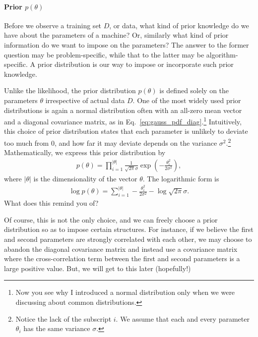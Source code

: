 \documentclass{report}
\begin{document}
\paragraph{Prior $p(\theta)$}

Before we observe a training set $D$, or data, what kind of prior knowledge do
we have about the parameters of a machine? Or, similarly what kind of prior
information do we want to impose on the parameters? The answer to the former
question may be problem-specific, while that to the latter may be
algorithm-specific. A prior distribution is our way to impose or incorporate
such prior knowledge. 

Unlike the likelihood, the prior distribution $p(\theta)$ is defined solely on
the parameters $\theta$ irrespective of actual data $D$. One of the most widely
used prior distributions is again a normal distribution often with an all-zero
mean vector and a diagonal covariance matrix, as in
Eq.~\eqref{eq:gauss_pdf_diag}.\footnote{
    Now you see why I introduced a normal distribution only when we were
    discussing about common distributions.
} Intuitively, this choice of prior distribution states that each parameter is
unlikely to deviate too much from $0$, and how far it may deviate depends on the
variance $\sigma^2$.\footnote{
    Notice the lack of the subscript $i$. We assume that each and every
    parameter $\theta_i$ has the same variance $\sigma$.
}
Mathematically, we express this prior distribution by
\begin{align*}
    p(\theta) = \prod_{i=1}^{|\theta|} \frac{1}{\sqrt{2\pi} \sigma} \exp \left(
    -\frac{\theta_i^2}{2 \sigma^2} \right),
\end{align*}
where $|\theta|$ is the dimensionality of the vector $\theta$. The logarithmic
form is 
\begin{align}
    \label{eq:logprior_gauss}
    \log p(\theta) = 
    \sum_{i=1}^{|\theta|} 
    -\frac{\theta_i^2}{2\sigma^2} - \log \sqrt{2\pi} \sigma.
\end{align}
What does this remind you of?

Of course, this is not the only choice, and we can freely
choose a prior distribution so as to impose certain structures. For instance, if
we believe the first and second parameters are strongly correlated with each
other, we may choose to abandon the diagonal covariance matrix and instead use a
covariance matrix where the cross-correlation term between the first and second
parameters is a large positive value. But, we will get to this later
(hopefully!)
\end{document}
